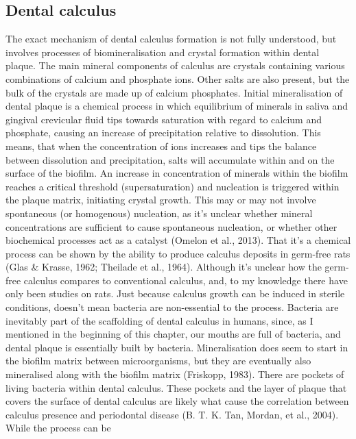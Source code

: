 \documentclass[
  letterpaper,
]{book}
\begin{document}
\hypertarget{dental-calculus}{%
\subsection{Dental calculus}\label{dental-calculus}}

The exact mechanism of dental calculus formation is not fully
understood, but involves processes of biomineralisation and crystal
formation within dental plaque. The main mineral components of calculus
are crystals containing various combinations of calcium and phosphate
ions. Other salts are also present, but the bulk of the crystals are
made up of calcium phosphates. Initial mineralisation of dental plaque
is a chemical process in which equilibrium of minerals in saliva and
gingival crevicular fluid tips towards saturation with regard to calcium
and phosphate, causing an increase of precipitation relative to
dissolution. This means, that when the concentration of ions increases
and tips the balance between dissolution and precipitation, salts will
accumulate within and on the surface of the biofilm. An increase in
concentration of minerals within the biofilm reaches a critical
threshold (supersaturation) and nucleation is triggered within the
plaque matrix, initiating crystal growth. This may or may not involve
spontaneous (or homogenous) nucleation, as it's unclear whether mineral
concentrations are sufficient to cause spontaneous nucleation, or
whether other biochemical processes act as a catalyst (Omelon et al.,
2013). That it's a chemical process can be shown by the ability to
produce calculus deposits in germ-free rats (Glas \& Krasse, 1962;
Theilade et al., 1964). Although it's unclear how the germ-free calculus
compares to conventional calculus, and, to my knowledge there have only
been studies on rats. Just because calculus growth can be induced in
sterile conditions, doesn't mean bacteria are non-essential to the
process. Bacteria are inevitably part of the scaffolding of dental
calculus in humans, since, as I mentioned in the beginning of this
chapter, our mouths are full of bacteria, and dental plaque is
essentially built by bacteria. Mineralisation does seem to start in the
biofilm matrix between microorganisms, but they are eventually also
mineralised along with the biofilm matrix (Friskopp, 1983). There are
pockets of living bacteria within dental calculus. These pockets and the
layer of plaque that covers the surface of dental calculus are likely
what cause the correlation between calculus presence and periodontal
disease (B. T. K. Tan, Mordan, et al., 2004). While the process can be
\end{document}
